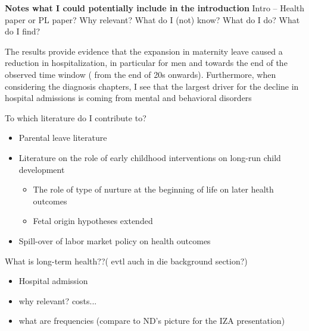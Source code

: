 \documentclass[11pt, a4paper,draft]{article} %
\begin{document}
\newpage
\textbf{Notes what I could potentially include in the introduction}\newline
Intro –
Health paper or PL paper?
Why relevant?
What do I (not) know?
What do I do?
What do I find?

The results provide evidence that the expansion in maternity leave caused a reduction in hospitalization, in particular for men and towards the end of the observed time window ( from the end of 20s onwards). Furthermore, when considering the  diagnosis chapters, I see that the largest driver for the decline in hospital admissions is coming from mental and behavioral disorders



To which literature do I contribute to?
\begin{itemize}
	\item Parental leave literature
	\item Literature on the role of early childhood interventions on long-run child development
	\begin{itemize}
		\item The role of type of nurture at the beginning of life on later health outcomes
		\item Fetal origin hypotheses extended
	\end{itemize}
	\item Spill-over of labor market policy on health outcomes
\end{itemize}

What is long-term health??( evtl auch in die background section?) 
\begin{itemize}
	\item Hospital admission
	\item why relevant? costs...
	\item what are frequencies (compare to ND's picture for the IZA presentation)
\end{itemize}
\end{document}
